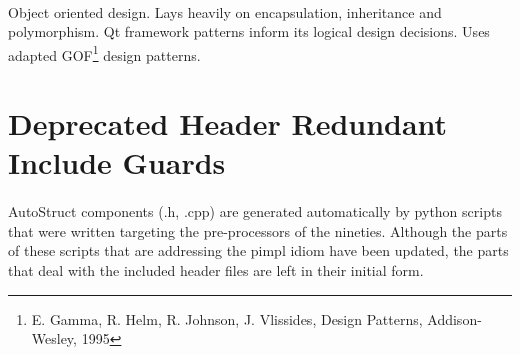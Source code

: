\paragraph{}
Object oriented design. Lays heavily on encapsulation, inheritance and polymorphism. Qt framework patterns inform its logical design decisions. Uses adapted GOF\footnote{E. Gamma, R. Helm, R. Johnson, J. Vlissides, Design Patterns, Addison-Wesley, 1995} design patterns.
\section{Deprecated Header Redundant Include Guards}
\paragraph{}
AutoStruct components (.h, .cpp) are generated automatically by python scripts that were written targeting the pre-processors of the nineties. Although the parts of these scripts that are addressing the pimpl idiom have been updated, the parts that deal with the included header files are left in their initial form.

